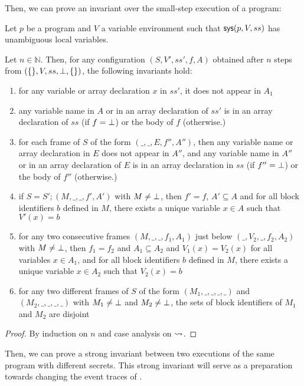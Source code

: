 Then, we can prove an invariant over the small-step execution of a 
program:
\begin{lemma}
Let $p$ be a  program and $V$ a variable environment such that
$\text{\textsf{sys}}(p,V,ss)$ has unambiguous local variables.

Let $n \in \mathbb N$. Then, for any  configuration $(S, V', ss',
f, A)$ obtained after $n$  steps from $(\{\}, V, ss, \bot, \{\})$,
the following invariants hold:
\begin{enumerate}
\item for any variable or array declaration $x$ in $ss'$, it does not
  appear in $A_1$
\item any variable name in $A$ or in an array declaration of $ss'$ is
  in an array declaration of $ss$ (if $f = \bot$) or the body of $f$
  (otherwise.)
\item for each frame of $S$ of the form $(\_, \_, E, f'', A'')$, then
  any variable name or array declaration in $E$ does not appear in
  $A''$, and any variable name in $A''$ or in an array declaration of
  $E$ is in an array declaration in $ss$ (if $f'' = \bot$) or the
  body of $f''$ (otherwise.)
\item \label{cstar-2-invar-memory-block-nil} if $S = S'; (M, \_, \_,
  f', A')$ with $M \not= \bot$, then $f' = f$, $A' \subseteq A$ and
  for all block identifiers $b$ defined in $M$, there exists a unique
  variable $x \in A$ such that $V'(x) = b$
\item \label{cstar-2-invar-memory-block-cons} for any two consecutive
  frames $(M, \_, \_, f_1, A_1)$ just below $(\_, V_2, \_, f_2, A_2)$
  with $M \not= \bot$, then $f_1 = f_2$ and $A_1 \subseteq A_2$ and
  $V_1(x) = V_2(x)$ for all variables $x \in A_1$, and for all block
  identifiers $b$ defined in $M$, there exists a unique variable $x
  \in A_2$ such that $V_2(x) = b$
\item \label{cstar-2-invar-memory-disjoint} for any two different
  frames of $S$ of the form $(M_1, \_, \_, \_, \_)$ and $(M_2, \_, \_,
  \_, \_)$ with $M_1 \not= \bot$ and $M_2 \not= \bot$, the sets of
  block identifiers of $M_1$ and $M_2$ are disjoint
\end{enumerate}
\end{lemma}
\begin{proof}
  By induction on $n$ and case analysis on $\leadsto$.
\end{proof}

Then, we can prove a strong invariant between two executions of
the same  program with different secrets. This strong invariant
will serve as a preparation towards changing the event traces of .

